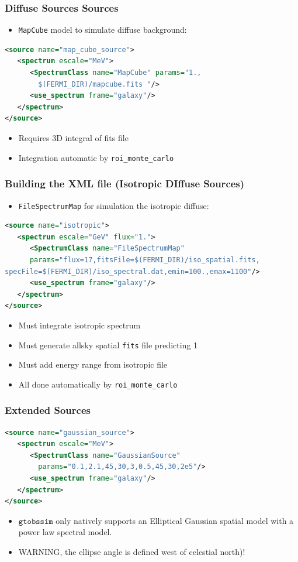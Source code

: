 \documentclass[12pt]{beamer}
\newcommand{\gtobssim}{\ensuremath{\mathtt{gtobssim}}\xspace}
\newcommand{\roimc}{\texttt{roi\_monte\_carlo}\xspace}
\newcommand{\FileSpectrumMap}{\texttt{FileSpectrumMap}\xspace}
\newcommand{\mapcube}{\texttt{MapCube}\xspace}
\begin{document}
\begin{frame}[fragile]
  \frametitle{Diffuse Sources Sources}
  \begin{itemize}
  \item \mapcube model to simulate diffuse background:
  \end{itemize}
\begin{lstlisting}[language=XML]
<source name="map_cube_source">
   <spectrum escale="MeV">
      <SpectrumClass name="MapCube" params="1., 
        $(FERMI_DIR)/mapcube.fits "/>
      <use_spectrum frame="galaxy"/>
   </spectrum>
</source>
\end{lstlisting}
  \begin{itemize}
    \item Requires 3D integral of fits file
    \item Integration automatic by \roimc
  \end{itemize}
\end{frame}

\begin{frame}[fragile]
  \frametitle{Building the XML file (Isotropic DIffuse Sources)}
\begin{itemize}
\item \FileSpectrumMap for simulation the isotropic diffuse:
\end{itemize}

\begin{lstlisting}[language=XML]
<source name="isotropic">
   <spectrum escale="GeV" flux="1.">
      <SpectrumClass name="FileSpectrumMap" 
      params="flux=17,fitsFile=$(FERMI_DIR)/iso_spatial.fits,
specFile=$(FERMI_DIR)/iso_spectral.dat,emin=100.,emax=1100"/>
      <use_spectrum frame="galaxy"/>
   </spectrum>
</source>
\end{lstlisting}

\begin{itemize}
  \item Must integrate isotropic spectrum
  \item Must generate allsky spatial \texttt{fits} file predicting 1 
  \item Must add energy range from isotropic file
  \item All done automatically by \roimc
\end{itemize}
\end{frame}

\begin{frame}[fragile]
\frametitle{Extended Sources}
\begin{lstlisting}[language=XML]
<source name="gaussian_source">
   <spectrum escale="MeV">
      <SpectrumClass name="GaussianSource" 
        params="0.1,2.1,45,30,3,0.5,45,30,2e5"/>
      <use_spectrum frame="galaxy"/>
   </spectrum>
</source>
\end{lstlisting}
  \begin{itemize}
    \item \gtobssim only natively supports an Elliptical Gaussian spatial model with a power law spectral model.
    \item WARNING, the ellipse angle is defined west of celestial north)!
  \end{itemize}
\end{frame}
\end{document}
